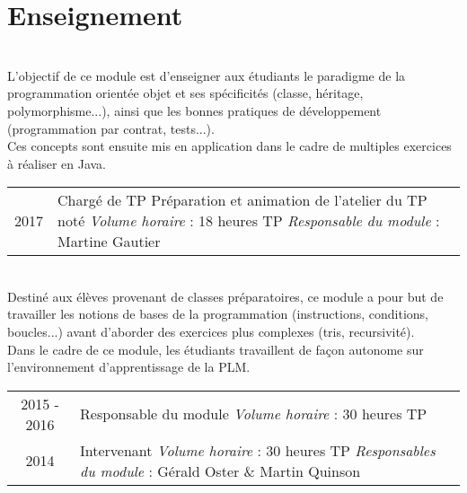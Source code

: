 \documentclass[]{deedy-resume-openfont}
\begin{document}

\section{Enseignement}

\\
L'objectif de ce module est d'enseigner aux étudiants le paradigme de la programmation orientée objet et ses spécificités (classe, héritage, polymorphisme...),
ainsi que les bonnes pratiques de développement (programmation par contrat, tests...).
\\
Ces concepts sont ensuite mis en application dans le cadre de multiples exercices à réaliser en Java.
\\
\begin{tabular}{cp{125mm}}
2017            & Chargé de TP\newline
                  Préparation et animation de l'atelier du TP noté\newline
                  \emph{Volume horaire} : 18 heures TP\newline
                  \emph{Responsable du module} : Martine Gautier\\
\end{tabular}
\sectionsep

\\
Destiné aux élèves provenant de classes préparatoires, ce module a pour but de travailler les notions de bases de la programmation (instructions, conditions, boucles...) avant d'aborder des exercices plus complexes (tris, recursivité).
\\
Dans le cadre de ce module, les étudiants travaillent de façon autonome sur l'environnement d'apprentissage de la PLM.
\\
\begin{tabular}{cp{125mm}}
2015 - 2016       & Responsable du module\newline
                  \emph{Volume horaire} : 30 heures TP\\
2014            & Intervenant\newline
                  \emph{Volume horaire} : 30 heures TP\newline
                  \emph{Responsables du module} : Gérald Oster \& Martin Quinson\\
\end{tabular}
\sectionsep
\end{document}
